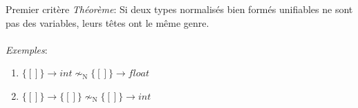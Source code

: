 \documentclass[serif]{beamer}
\newcommand{\exemples}{\textit{Exemples}\xspace}
\newcommand{\theoreme}{\textit{Théorème}\xspace}
\newcommand{\mset}[1]{\{\![#1]\!\}}
\newcommand{\N}{\mathrm{N}}
\begin{document}

\begin{frame}{Premier critère}
\small
\theoreme : Si deux types normalisés bien formés unifiables ne sont pas des variables, leurs têtes ont le même genre.
\\~\\
\exemples :
\begin{enumerate}
	\item $\mset{} \rightarrow int \nsim_\N \mset{} \rightarrow float$
	\item $\mset{} \rightarrow \mset{} \nsim_\N \mset{} \rightarrow int$
\end{enumerate}
\end{frame}

\end{document}
